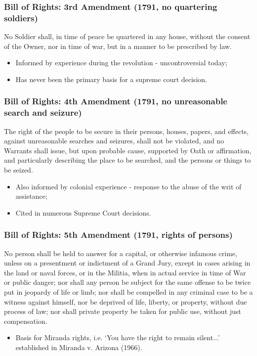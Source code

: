 \documentclass[aspectratio=169]{beamer}
\theoremstyle{principle}
\begin{document}
\begin{frame}
\frametitle{Bill of Rights: 3rd Amendment (1791, no quartering soldiers)}
No Soldier shall, in time of peace be quartered in any house, without the consent of the Owner, nor in time of war, but in a manner to be prescribed by law.
\bigskip
\begin{itemize}
\item Informed by experience during the revolution - uncontroversial today;
\item Has never been the primary basis for a supreme court decision.
\end{itemize}

\end{frame}

\begin{frame}
\frametitle{Bill of Rights: 4th Amendment (1791, no unreasonable search and seizure)}
The right of the people to be secure in their persons, houses, papers, and effects, against unreasonable searches and seizures, shall not be violated, and no Warrants shall issue, but upon probable cause, supported by Oath or affirmation, and particularly describing the place to be searched, and the persons or things to be seized.
\bigskip
\begin{itemize}
\item Also informed by colonial experience - response to the abuse of the writ of assistance;
\item Cited in numerous Supreme Court decisions.
\end{itemize}

\end{frame}

\begin{frame}
\frametitle{Bill of Rights: 5th Amendment (1791, rights of persons)}
No person shall be held to answer for a capital, or otherwise infamous crime, unless on a presentment or indictment of a Grand Jury, except in cases arising in the land or naval forces, or in the Militia, when in actual service in time of War or public danger; nor shall any person be subject for the same offense to be twice put in jeopardy of life or limb; nor shall be compelled in any criminal case to be a witness against himself, nor be deprived of life, liberty, or property, without due process of law; nor shall private property be taken for public use, without just compensation.
\bigskip
\begin{itemize}
\item Basis for Miranda rights, i.e. `You have the right to remain silent...' established in Miranda v. Arizona (1966).
\end{itemize}

\end{frame}
\end{document}
